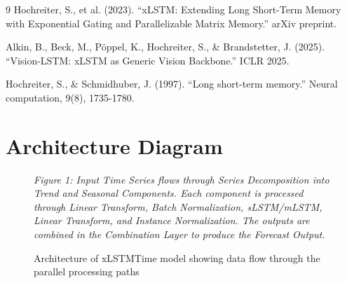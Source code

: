 \documentclass[11pt,a4paper]{article}
\begin{document}
\begin{thebibliography}{9}
Hochreiter, S., et al. (2023). ``xLSTM: Extending Long Short-Term Memory with Exponential Gating and Parallelizable Matrix Memory.'' arXiv preprint.

Alkin, B., Beck, M., Pöppel, K., Hochreiter, S., \& Brandstetter, J. (2025). ``Vision-LSTM: xLSTM as Generic Vision Backbone.'' ICLR 2025.

Hochreiter, S., \& Schmidhuber, J. (1997). ``Long short-term memory.'' Neural computation, 9(8), 1735-1780.
\end{thebibliography}

\section*{Architecture Diagram}

\begin{figure}[H]
\centering
\caption{Architecture of xLSTMTime model showing data flow through the parallel processing paths}
\label{fig:architecture}
\textit{Figure 1: Input Time Series flows through Series Decomposition into Trend and Seasonal Components. Each component is processed through Linear Transform, Batch Normalization, sLSTM/mLSTM, Linear Transform, and Instance Normalization. The outputs are combined in the Combination Layer to produce the Forecast Output.}
\end{figure}
\end{document}
